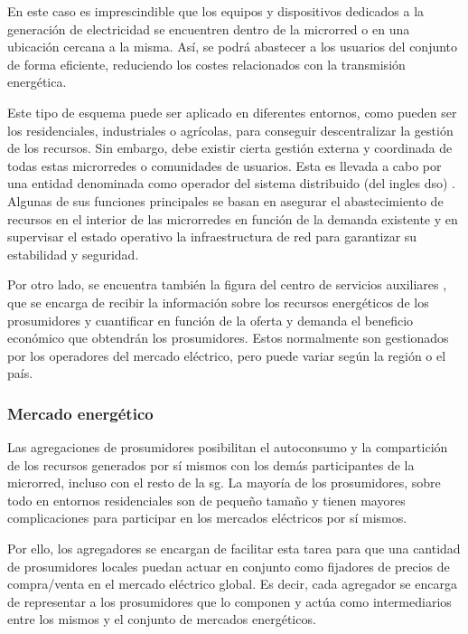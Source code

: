 En este caso es imprescindible que los equipos y dispositivos dedicados a la generación de electricidad se encuentren dentro de la microrred o en una ubicación cercana a la misma. Así, se podrá abastecer a los usuarios del conjunto de forma eficiente, reduciendo los costes relacionados con la transmisión energética. 

\vspace{3mm}

Este tipo de esquema puede ser aplicado en diferentes entornos, como pueden ser los residenciales, industriales o agrícolas, para conseguir descentralizar la gestión de los recursos. Sin embargo, debe existir cierta gestión externa y coordinada de todas estas microrredes o comunidades de usuarios. Esta es llevada a cabo por una entidad denominada como operador del sistema distribuido (del ingles \gls{dso}) \cite{transactive} \cite{dso}. Algunas de sus funciones principales se basan en asegurar el abastecimiento de recursos en el interior de las microrredes en función de la demanda existente y en supervisar el estado operativo la infraestructura de red para garantizar su estabilidad y seguridad. 

\vspace{3mm}

Por otro lado, se encuentra también la figura del centro de servicios auxiliares \cite{transactive}, que se encarga de recibir la información sobre los recursos energéticos de los prosumidores y cuantificar en función de la oferta y demanda el beneficio económico que obtendrán los prosumidores. Estos normalmente son gestionados por los operadores del mercado eléctrico, pero puede variar según la región o el país.

\vspace{3mm}

\subsubsection{Mercado energético}

Las agregaciones de prosumidores posibilitan el autoconsumo y la compartición de los recursos generados por sí mismos con los demás participantes de la microrred, incluso con el resto de la \gls{sg}. La mayoría de los prosumidores, sobre todo en entornos residenciales son de pequeño tamaño y tienen mayores complicaciones para participar en los mercados eléctricos por sí mismos. 

\vspace{3mm}

Por ello, los agregadores \cite{bidding} \cite{transactive} se encargan de facilitar esta tarea para que una cantidad de prosumidores locales puedan actuar en conjunto como fijadores de precios de compra/venta en el mercado eléctrico global. Es decir, cada agregador se encarga de representar a los prosumidores que lo componen y actúa como intermediarios entre los mismos y el conjunto de mercados energéticos. 

